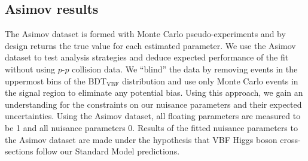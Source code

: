 
\subsection{Asimov results}
The Asimov dataset is formed with Monte Carlo pseudo-experiments and by design returns the true value for each estimated parameter. We use the Asimov dataset to test analysis strategies and deduce expected performance of the fit without using $p$-$p$ collision data. We ``blind'' the data by removing events in the uppermost bins of the BDT$_{\text{VBF}}$ distribution and use only Monte Carlo events in the signal region to eliminate any potential bias. Using this approach, we gain an understanding for the constraints on our nuisance parameters and their expected uncertainties. Using the Asimov dataset, all floating parameters are measured to be 1 and all nuisance parameters 0. Results of the fitted nuisance parameters to the Asimov dataset are made under the hypothesis that VBF Higgs boson cross-sections follow our Standard Model predictions. 

